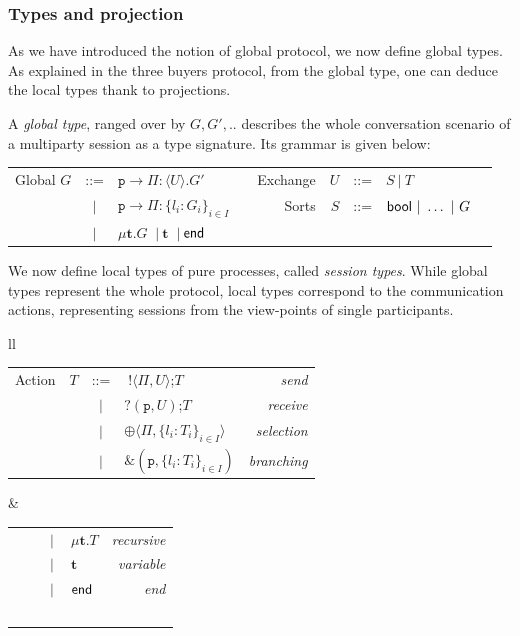 \documentclass[a4paper,11pt,twoside]{report}
\newcommand{\ptilde}[1]{{\ensuremath{#1}}}
\newcommand{\kf}[1]{\textup{\textsf{#1}}\xspace}
\newcommand{\pset}{\ensuremath{\Pi}}
\newcommand{\participant}[1]{\ensuremath{\mathtt{#1}}}
\newcommand{\p}{\ensuremath{\participant{p}}}
\newcommand{\sep}{\ensuremath{~\mathbf{|}~ }}
\newcommand{\G}{\ensuremath{G}}
\newcommand{\Gv}[4]{\ensuremath{#1\to\pset:\langle#3\rangle.#4}}
\newcommand{\U}{\ensuremath{U}}
\newcommand{\T}{\ensuremath{T}}
\newcommand{\UT}{\ensuremath{U}}
\newcommand{\oT}[2]{\ensuremath{\;!\langle #2,#1\rangle}}
\newcommand{\iT}[2]{\ensuremath{?( #2,#1 )}}
\newcommand{\ty}{\textbf{t}}
\newcommand{\End}{\kf{end}}
\newcommand{\Bool}{\kf{bool}}
\newcommand{\seltype}{\ensuremath{\oplus \langle \pset,\{l_i:\T_i\}_{i\in
I} \rangle }}
\newcommand{\branchtype}{\ensuremath{\&(\p,\{l_i:\T_i\}_{i\in I})}}
\begin{document}
\subsubsection{Types and projection}
As we have introduced the notion of global protocol, we now define global types. As explained in the three buyers protocol, from the global type, one can deduce the local types thank to projections.

A \emph{global type}, ranged over by $G, G',..$ describes the whole conversation scenario of a multiparty session as a type signature. Its grammar is given below:
\begin{center}
\begin{tabular}{rclrrrclr}
Global \quad  $\G$ & ::= & $\Gv\p\p\U{\G'}$  &\quad \quad \quad & Exchange \quad & $\UT$   & ::= & $\ptilde{S}\ |\ \T$ \\
      & \sep & $\p\rightarrow\pset:\{l_i:\G_i\}_{i\in I}$ & & Sorts \quad &   $S$   & ::= & $\Bool\ |\ \ldots\ |\ G$ & \\
      & \sep & $\mu \ty.\G$  \sep $\ty$ \sep $\End$
\end{tabular}
\end{center}

We now define local types of pure processes, called {\em session types}. While global types represent the whole protocol, local types correspond to the communication actions, representing sessions from the view-points of single participants.
\begin{center}
\small
\begin{tabular}{ll}
\begin{tabular}{lrclr}
  {Action} \quad \quad & $\T$ & ::= & \oT\UT{\pset};\T \
  & \emph{send}\\ &     & \sep & \iT \UT\p;\T &\emph{receive}\\
         &     & \sep & \seltype &\emph{selection}\\
         &     & \sep & \branchtype &\emph{branching}\\
\end{tabular}&
         \begin{tabular}{lrclr}
         &     & \sep & $\mu \ty.\T$ &\emph{recursive}\\
         &     & \sep & $\ty$  &\emph{variable}\\
         &     & \sep & $\End$ &\emph{end}\\
         &  $\;$   &  &\\
\end{tabular}
\\
\end{tabular}
\end{center}
\end{document}
